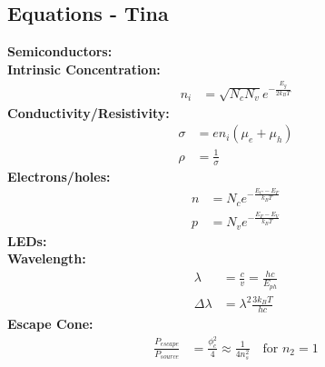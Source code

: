 \documentclass[landscape,a4paper]{article}
\begin{document}
\begin{multicols}{3}
	\section{Equations - Tina}
	\textbf{Semiconductors:}\\
	\hspace{3mm}\textbf{Intrinsic Concentration:}
	\begin{align}
		n_i &= \sqrt{N_c N_v} e^{-\frac{E_g}{2 k_B T}}
	\end{align}
	\hspace{3mm}\textbf{Conductivity/Resistivity:}
	\begin{align}
		\sigma &= e n_i (\mu_e + \mu_h)\\
		\rho &= \frac{1}{\sigma}
	\end{align}
	\hspace{3mm}\textbf{Electrons/holes:}
	\begin{align}
		n &= N_c e^{-\frac{E_C - E_F}{k_B T}}\\
		p &= N_v e^{-\frac{E_F - E_V}{k_B T}}
	\end{align}
	\textbf{LEDs:}\\
	\hspace{3mm}\textbf{Wavelength:}
	\begin{align}
		\lambda &= \frac{c}{v} = \frac{hc}{E_{ph}}\\
		\Delta \lambda &= \lambda^2 \frac{3 k_B T}{hc}
	\end{align}
	\hspace{3mm}\textbf{Escape Cone:}
	\begin{align}
		\frac{P_{escape}}{P_{source}} &= \frac{\phi_c^2}{4} \approx \frac{1}{4n_s^2}\quad \text{for } n_2=1
	\end{align}
\end{multicols}
\end{document}

